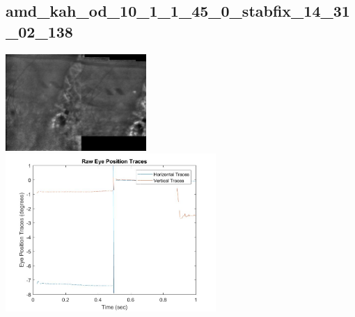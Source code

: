\documentclass[11pt]{article}
\begin{document}
\subsection{amd\_kah\_od\_10\_1\_1\_45\_0\_stabfix\_14\_31\_02\_138}
\includegraphics[width=0.40\textwidth, valign=m]{referenceframes/tslo_amd/amd_kah_od_10_1_1_45_0_stabfix_14_31_02_138_dwt_nostim_gamscaled_bandfilt_refframe.jpg}
\includegraphics[width=0.60\textwidth, valign=m]{eyepositiontraces/tslo_amd/amd_kah_od_10_1_1_45_0_stabfix_14_31_02_138.jpg}\\
\end{document}
